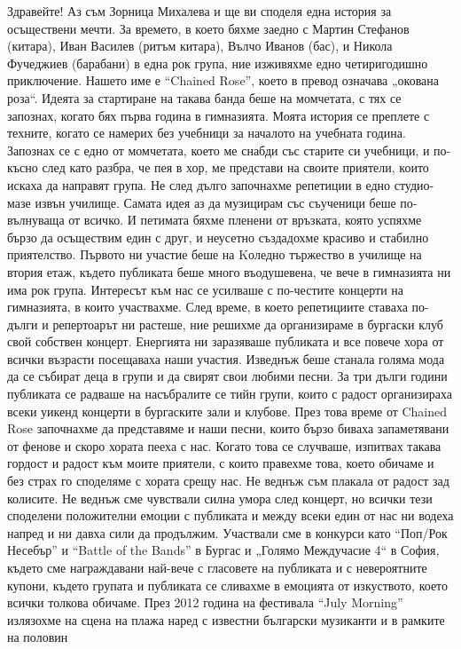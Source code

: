 \begin{multicols}{3}
Здравейте! Аз съм Зорница Михалева и ще ви споделя една история за осъществени мечти. За времето, в което бяхме заедно с Мартин Стефанов (китара), Иван Василев (ритъм китара), Вълчо Иванов (бас), и Никола Фучеджиев (барабани) в една рок група, ние изживяхме едно четиригодишно приключение. Нашето име е  “Chained Rose”, което в превод означава „окована роза“. Идеята за стартиране на такава банда беше на момчетата, с тях се запознах, когато бях първа година в гимназията. Моята история се преплете с техните, когато се 
намерих без учебници за началото на учебната година. Запознах се с едно от момчетата, което ме снабди със старите си учебници, и по-късно след като разбра, че пея в хор, ме представи на своите приятели, които искаха да направят група. Не след дълго започнахме репетиции в едно студио-мазе извън училище. Самата идея аз да музицирам със съученици беше по-вълнуваща от всичко. И петимата бяхме пленени от връзката, която успяхме бързо да осъществим един с друг, и неусетно 
създадохме красиво и стабилно приятелство. Първото ни участие беше на Kоледно тържество в училище на втория етаж, където публиката беше много въодушевена, че вече в гимназията ни има рок група. Интересът към нас се усилваше с по-честите концерти на гимназията, в които участвахме. След време, в което репетициите 
ставаха по-дълги и репертоарът ни растеше, ние решихме да организираме в бургаски клуб свой собствен концерт. Енергията ни заразяваше публиката и все повече хора от всички възрасти посещаваха наши участия. Изведнъж беше станала голяма мода да 
се събират деца в групи и да свирят свои любими песни. За три дълги години публиката се радваше на насъбралите се тийн групи, които с радост организираха всеки уикенд концерти в бургаските зали и клубове. През това време от Chained Rose започнахме да представяме и наши песни, които бързо биваха запаметявани от фенове и скоро хората пееха с нас. Когато това се случваше, изпитвах такава 
гордост и радост към моите приятели, с които правехме това, което обичаме и без страх го споделяме с хората срещу нас. Не веднъж съм плакала от радост зад колисите. Не веднъж сме чувствали силна умора след концерт, но всички тези споделени положителни емоции с публиката и между всеки един от нас ни водеха 
напред и ни давха сили да продължим. Участвали сме в конкурси като “Поп/Рок Несебър” и “Battle of the Bands” в Бургас и „Голямо Междучасие 4“ в София, където сме награждавани най-вече с гласовете на публиката и с невероятните купони, където групата и публиката се сливахме в емоцията от изкуството, което всички толкова обичаме. През 2012 година на фестивала “July Morning” излязохме на сцена на плажа наред с известни български музиканти и в рамките на половин 

\end{multicols}
